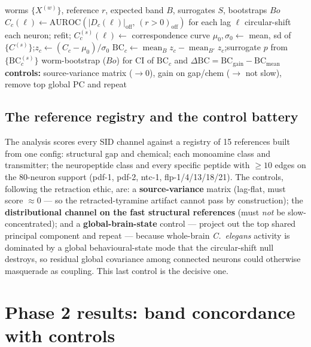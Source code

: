 \documentclass[11pt]{article}
\begin{document}
\begin{algorithm}[t]
\caption{Band concordance with the full control battery (one channel $\times$ reference)}
\label{alg:batc}
\begin{algorithmic}[1]
\Require worms $\{X^{(w)}\}$, reference $r$, expected band $B$, surrogates $S$, bootstraps $Bo$
\State $C_c(\ell)\gets\mathrm{AUROC}\!\left(|D_c(\ell)|_{\text{off}},\,(r>0)_{\text{off}}\right)$ for each lag $\ell$
 
  \State circular-shift each neuron; refit; $C^{(s)}_c(\ell)\gets$ correspondence curve
\EndFor
\State $\mu_0,\sigma_0\gets$ mean, sd of $\{C^{(s)}\}$;\quad $z_c\gets(C_c-\mu_0)/\sigma_0$
\State $\mathrm{BC}_{c}\gets \operatorname{mean}_{B} z_c - \operatorname{mean}_{B'} z_c$;\quad surrogate $p$ from $\{\mathrm{BC}^{(s)}_c\}$
\State worm-bootstrap ($Bo$) for CI of $\mathrm{BC}_c$ and $\Delta\mathrm{BC}=\mathrm{BC}_{\text{gain}}-\mathrm{BC}_{\text{mean}}$
\State \textbf{controls:} source-variance matrix ($\to0$), gain on gap/chem ($\to$ not slow), remove top global PC and repeat
\end{algorithmic}
\end{algorithm}

\subsection{The reference registry and the control battery}
The analysis scores every SID channel against a registry of 15 references built from one config:
structural gap and chemical; each monoamine class and transmitter; the neuropeptide class and every
specific peptide with $\ge10$ edges on the 80-neuron support (pdf-1, pdf-2, ntc-1, flp-1/4/13/18/21).
The controls, following the retraction ethic, are: a \textbf{source-variance} matrix (lag-flat, must
score $\approx0$ --- so the retracted-tyramine artifact cannot pass by construction); the
\textbf{distributional channel on the fast structural references} (must \emph{not} be
slow-concentrated); and a \textbf{global-brain-state} control --- project out the top shared principal
component and repeat --- because whole-brain \textit{C.\ elegans} activity is dominated by a global
behavioural-state mode that the circular-shift null destroys, so residual global covariance among
connected neurons could otherwise masquerade as coupling. This last control is the decisive one.

\section{Phase 2 results: band concordance with controls}
\label{sec:phase2}
\end{document}
